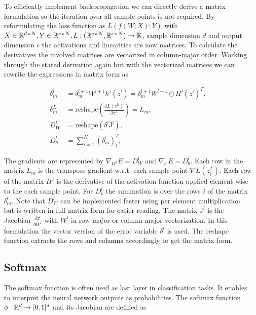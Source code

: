 \documentclass[english,11pt,a4paper]{article}
\begin{document}
To efficiently implement backpropagation we can directly derive a matrix formulation so the iteration over all sample points is not required. By reformulating the loss function as $L(f(W;X);Y)$ with $X \in \mathbb{R}^{d \times N}, Y \in \mathbb{R}^{c \times N}, L: (\mathbb{R}^{c \times N},\mathbb{R}^{c \times N}) \to \mathbb{R}$, sample dimension $d$ and output dimension $c$ the activations and linearities are now matrices. To calculate the derivatives the involved matrices are vectorized in column-major order. Working through the stated derivation again but with the vectorized matrices we can rewrite the expressions in matrix form as

\begin{equation}
	\begin{aligned}
		\delta^l_m &= \delta^{l+1}_m W^{l+1} h'(z^l) = \delta^{l+1}_m W^{l+1} \odot H'(z^l)^T, \\
		\delta^L_m &= \text{reshape}(\frac{\partial L(z^L)}{\partial z^L}) = L_m, \\
		D_W^l &= \text{reshape}(\delta^l \mathrm{J}^l), \\
		D_b^l &= \sum_{i=1}^{N} (\delta^l_m)_{i}^T.
	\end{aligned}
\end{equation}

The gradients are represented by $\nabla_{W^l}E = D^l_W$ and $\nabla_{b^l}E = D^l_b$. Each row in the matrix $L_m$ is the transpose gradient w.r.t. each sample point $\nabla L(z^L_i)$. Each row of the matrix $H'$ is the derivative of the activation function applied element wise to the each sample point. For $D^l_b$ the summation is over the rows $i$ of the matrix $\delta^l_m$. Note that $D^l_W$ can be implemented faster using per element multiplication but is written in full matrix form for easier reading. The matrix $\mathrm{J}^l$ is the Jacobian $\frac{\partial z^l}{\partial W^l}$ with $W^l$ in row-major or column-major vectorization. In this formulation the vector version of the error variable $\delta^l$ is used. The reshape function extracts the rows and columns accordingly to get the matrix form.

\subsection{Softmax}

The softmax function is often used as last layer in classification tasks. It enables to interpret the neural network outputs as probabilities. The softmax function $\phi: \mathbb{R}^d \to [0,1]^d$ and its Jacobian are defined as
\end{document}
